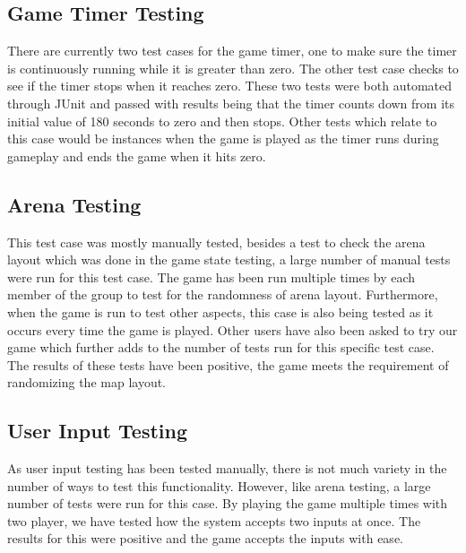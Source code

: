 \documentclass[12pt, letterpaper]{article}
\begin{document}
\subsection{Game Timer Testing}
\indent \indent There are currently two test cases for the game timer, one to make sure the timer is continuously running while it is greater than zero. The other test case checks to see if the timer stops when it reaches zero. These two tests were both automated through JUnit and passed with results being that the timer counts down from its initial value of 180 seconds to zero and then stops. Other tests which relate to this case would be instances when the game is played as the timer runs during gameplay and ends the game when it hits zero.
\subsection{Arena Testing}
\indent \indent This test case was mostly manually tested, besides a test to check the arena layout which was done in the game state testing, a large number of manual tests were run for this test case. The game has been run multiple times by each member of the group to test for the randomness of arena layout. Furthermore, when the game is run to test other aspects, this case is also being tested as it occurs every time the game is played. Other users have also been asked to try our game which further adds to the number of tests run for this specific test case. The results of these tests have been positive, the game meets the requirement of randomizing the map layout.
\subsection{User Input Testing}
\indent \indent As user input testing has been tested manually, there is not much variety in the number of ways to test this functionality. However, like arena testing, a large number of tests were run for this case. By playing the game multiple times with two player, we have tested how the system accepts two inputs at once. The results for this were positive and the game accepts the inputs with ease.
\end{document}
